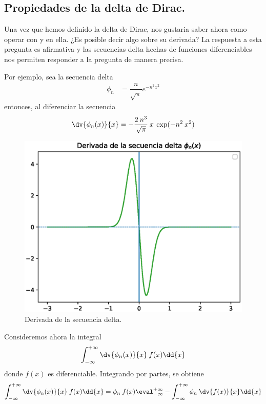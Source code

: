 \subsection{Propiedades de la delta de Dirac.}
Una vez que hemos definido la delta de Dirac, nos gustaria saber ahora como operar con y en ella. ¿Es posible decir algo sobre su derivada? La respuesta a esta pregunta es afirmativa y las secuencias delta hechas de funciones diferenciables nos permiten responder a la pregunta de manera precisa.
\par
Por ejemplo, sea la secuencia delta
\begin{align*}
\phi_{n} &= \dfrac{n}{\sqrt{\pi}} e^{-n^{2} x^{2}}
\end{align*}
entonces, al diferenciar la secuencia
\begin{align*}
\dv{\phi_{n}(x)}{x} = - \dfrac{2 \: n^{3}}{\sqrt{\pi}} \: x \: \exp(-n^{2} \: x^{2})
\end{align*}
\begin{figure}[H]
    \centering
    \includegraphics[scale=0.6]{Imagenes/secuencia_delta_04.eps}
    \caption{Derivada de la secuencia delta.}
    \label{fig:fig_figura_delta_04}
\end{figure}
Consideremos ahora la integral
\begin{align*}
\int_{-\infty}^{+\infty} \dv{\phi_{n}(x)}{x} \: f(x) \dd{x}
\end{align*}
donde $f(x)$ es diferenciable. Integrando por partes, se obtiene
\begin{align*}
\int_{-\infty}^{+\infty} \dv{\phi_{n}(x)}{x} \: f(x) \dd{x} = \phi_{n} \: f(x) \eval_{-\infty}^{+\infty} - \int_{-\infty}^{+\infty} \phi_{n} \: \dv{f(x)}{x} \dd{x}
\end{align*}
